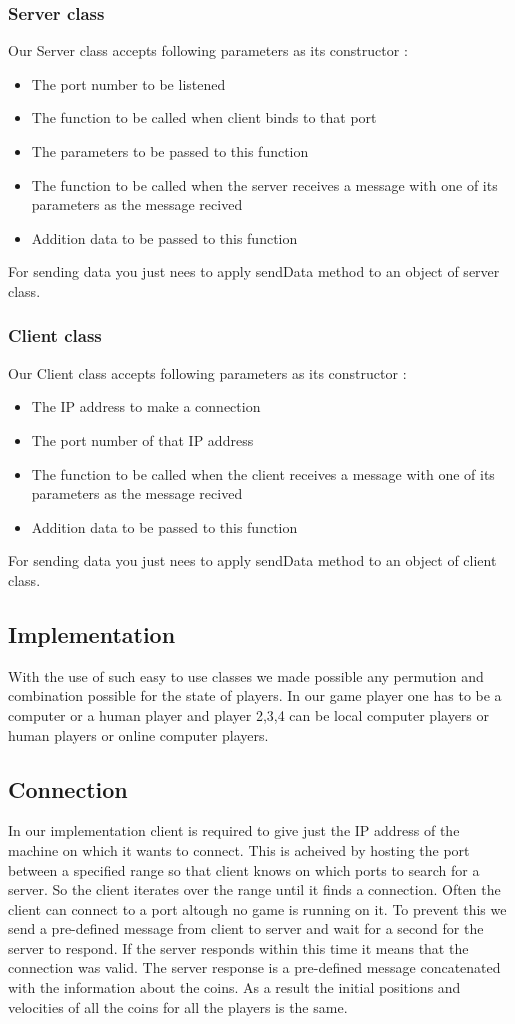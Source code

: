 \documentclass[11pt,a4paper,oneside]{report}
\begin{document}
\subsubsection{Server class}
Our Server class accepts following parameters as its constructor :
\begin{itemize}
\item{The port number to be listened}
\item{The function to be called when client binds to that port}
\item{The parameters to be passed to this function}
\item{The function to be called when the server receives a message with one of its parameters as the message recived}
\item{Addition data to be passed to this function}
\end{itemize}
For sending data you just nees to apply sendData method to an object of server class.
\subsubsection{Client class}
Our Client class accepts following parameters as its constructor :
\begin{itemize}
\item{The IP address to make a connection}
\item{The port number of that IP address}
\item{The function to be called when the client receives a message with one of its parameters as the message recived}
\item{Addition data to be passed to this function}
\end{itemize}
For sending data you just nees to apply sendData method to an object of client class.
\subsection{Implementation}
With the use of such easy to use classes we made possible any permution and combination possible for the state of players.
In our game player one has to be a computer or a human player and player 2,3,4 can be local computer players or human players or online computer players.
\subsection{Connection}
In our implementation client is required to give just the IP address of the machine on which it wants to connect. This is acheived by hosting the port between a specified range so that client knows on which ports to search for a server. So the client iterates over the range until it finds a connection. Often the client can connect to a port altough no game is running on it. To prevent this we send a pre-defined message from client to server and wait for a second for the server to respond. If the server responds within this time it means that the connection was valid. The server response is a pre-defined message concatenated with the information about the coins. As a result the initial positions and velocities of all the coins for all the players is the same.
\end{document}
